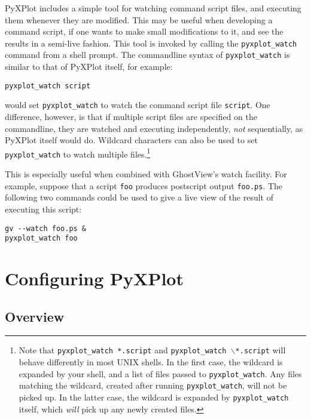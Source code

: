 \documentclass[a4paper,onecolumn,11pt]{book}
\begin{document}
PyXPlot includes a simple tool for watching command script files, and executing
them whenever they are modified. This may be useful when developing a command
script, if one wants to make small modifications to it, and see the results in
a semi-live fashion. This tool is invoked by calling the
\texttt{pyxplot\_watch} command
from a shell prompt. The commandline syntax of \texttt{pyxplot\_watch} is
similar to that of PyXPlot itself, for example:

\begin{verbatim}
pyxplot_watch script
\end{verbatim}

\noindent would set \texttt{pyxplot\_watch} to watch the command script file
\texttt{script}. One difference, however, is that if multiple script files are
specified on the commandline, they are watched and executing independently,
\textit{not} sequentially, as PyXPlot itself would do. Wildcard characters can
also be used to set \texttt{pyxplot\_watch} to watch multiple
files.\footnote{Note that \texttt{pyxplot\_watch *.script} and
\texttt{pyxplot\_watch $\backslash$*.script} will behave differently in most
UNIX shells.  In the first case, the wildcard is expanded by your shell, and a
list of files passed to \texttt{pyxplot\_watch}. Any files matching the
wildcard, created after running \texttt{pyxplot\_watch}, will not be picked up.
In the latter case, the wildcard is expanded by \texttt{pyxplot\_watch} itself,
which \textit{will} pick up any newly created files.}

This is especially useful when combined with GhostView's watch facility. For
example, suppose that a script \texttt{foo} produces postscript output
\texttt{foo.ps}. The following two commands could be used to give a live view
of the result of executing this script:

\begin{verbatim}
gv --watch foo.ps &
pyxplot_watch foo
\end{verbatim}

\chapter{Configuring PyXPlot}

\section{Overview}

\label{configuration}
\end{document}
